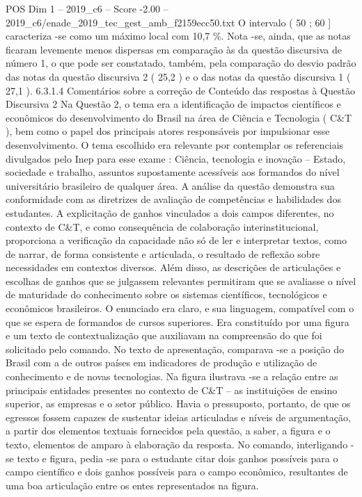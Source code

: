 \begin{textsample}{POS Dim 1 – 2019\_c6 – Score -2.00 – 2019\_c6/enade\_2019\_tec\_gest\_amb\_f2159ecc50.txt}
O intervalo ( 50 ; 60 ] caracteriza -se como um máximo local com 10,7 \%.
Nota -se, ainda, que as notas ficaram levemente menos dispersas em comparação às da questão discursiva de número 1, o que pode ser constatado, também, pela comparação do desvio padrão das notas da questão discursiva 2 ( 25,2 ) e o das notas da questão discursiva 1 ( 27,1 ). 6.3.1.4 Comentários sobre a correção de Conteúdo das respostas à Questão Discursiva 2 Na Questão 2, o tema era a identificação de impactos científicos e econômicos do desenvolvimento do Brasil na área de Ciência e Tecnologia ( C\&T ), bem como o papel dos principais atores responsáveis por impulsionar esse desenvolvimento.
O tema escolhido era relevante por contemplar os referenciais divulgados pelo Inep para esse exame : Ciência, tecnologia e inovação – Estado, sociedade e trabalho, assuntos supostamente acessíveis aos formandos do nível universitário brasileiro de qualquer área.
A análise da questão demonstra sua conformidade com as diretrizes de avaliação de competências e habilidades dos estudantes.
A explicitação de ganhos vinculados a dois campos diferentes, no contexto de C\&T, e como consequência de colaboração interinstitucional, proporciona a verificação da capacidade não só de ler e interpretar textos, como de narrar, de forma consistente e articulada, o resultado de reflexão sobre necessidades em contextos diversos.
Além disso, as descrições de articulações e escolhas de ganhos que se julgassem relevantes permitiram que se avaliasse o nível de maturidade do conhecimento sobre os sistemas científicos, tecnológicos e econômicos brasileiros.
O enunciado era claro, e sua linguagem, compatível com o que se espera de formandos de cursos superiores.
Era constituído por uma figura e um texto de contextualização que auxiliavam na compreensão do que foi solicitado pelo comando.
No texto de apresentação, comparava -se a posição do Brasil com a de outros países em indicadores de produção e utilização de conhecimento e de novas tecnologias.
Na figura ilustrava -se a relação entre as principais entidades presentes no contexto de C\&T – as instituições de ensino superior, as empresas e o setor público.
Havia o pressuposto, portanto, de que os egressos fossem capazes de sustentar ideias articuladas e níveis de argumentação, a partir dos elementos textuais fornecidos pela questão, a saber, a figura e o texto, elementos de amparo à elaboração da resposta.
No comando, interligando -se texto e figura, pedia -se para o estudante citar dois ganhos possíveis para o campo científico e dois ganhos possíveis para o campo econômico, resultantes de uma boa articulação entre os entes representados na figura.

\end{textsample}
